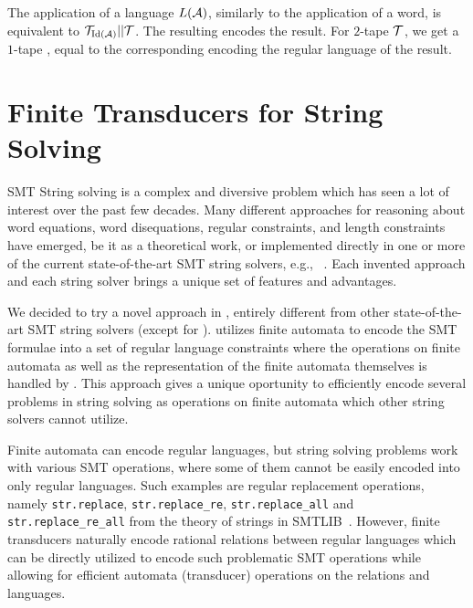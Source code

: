 The application of a language $L(\mathcal{A})$, similarly to the application of a word, is equivalent to $\mathcal{T}_{\text{Id}(\mathcal{A})} || \mathcal{T}$.
The resulting \nft encodes the result.
For $2$-tape $\mathcal{T}$, we get a $1$-tape \nft, equal to the corresponding \nfa encoding the regular language of the result.



\chapter{Finite Transducers for String Solving}

SMT String solving is a complex and diversive problem which has seen a lot of interest over the past few decades.
Many different approaches for reasoning about word equations, word disequations, regular constraints, and length constraints have emerged, be it as a theoretical work, or implemented directly in one or more of the current state-of-the-art SMT string solvers, e.g., ~\cite{cvc4,cvc5,z3,Z3-str,Z3Str3,Z3str4,Trau,fm23_equations_synergy_regular_constraints_DBLP:conf/fm/BlahoudekCCHHLS23, tacas24_noodler_10.1007/978-3-031-57246-3_2, oopsla23_stabilization_DBLP:journals/pacmpl/ChenCHHLS23}.
Each invented approach and each string solver brings a unique set of features and advantages.

We decided to try a novel approach in \noodler, entirely different from other state-of-the-art SMT string solvers (except for \ostrich).
\noodler utilizes finite automata to encode the SMT formulae into a set of regular language constraints where the operations on finite automata as well as the representation of the finite automata themselves is handled by \mata.
This approach gives \noodler a unique oportunity to efficiently encode several problems in string solving as operations on finite automata which other string solvers cannot utilize.

Finite automata can encode regular languages, but string solving problems work with various SMT operations, where some of them cannot be easily encoded into only regular languages.
Such examples are regular replacement operations, namely \texttt{str.replace}, \texttt{str.replace\_re}, \texttt{str.replace\_all} and \texttt{str.replace\_re\_all} from the theory of strings in SMTLIB~\cite{smtlib_theory_strings}.
However, finite transducers naturally encode rational relations between regular languages which can be directly utilized to encode such problematic SMT operations while allowing for efficient automata (transducer) operations on the relations and languages.

